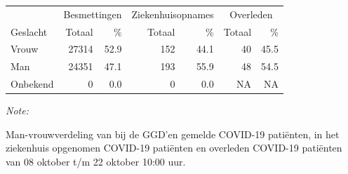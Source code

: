 \documentclass[
  english,
  man,floatsintext]{apa6}
\begin{document}
\begin{table}
\centering\begingroup\fontsize{11}{13}\selectfont

\begin{threeparttable}
\begin{tabular}{lrrrrrr}
\toprule
\multicolumn{1}{c}{ } & \multicolumn{2}{c}{Besmettingen} & \multicolumn{2}{c}{Ziekenhuisopnames} & \multicolumn{2}{c}{Overleden} \\
\cmidrule(l{3pt}r{3pt}){2-3} \cmidrule(l{3pt}r{3pt}){4-5} \cmidrule(l{3pt}r{3pt}){6-7}
Geslacht & Totaal & \% & Totaal & \% & Totaal & \%\\
\midrule
Vrouw & 27314 & 52.9 & 152 & 44.1 & 40 & 45.5\\
Man & 24351 & 47.1 & 193 & 55.9 & 48 & 54.5\\
Onbekend & 0 & 0.0 & 0 & 0.0 & NA & NA\\
\bottomrule
\end{tabular}
\begin{tablenotes}
\item \textit{Note: } 
\item Man-vrouwverdeling van bij de GGD’en gemelde COVID-19 patiënten, in het ziekenhuis opgenomen COVID-19 patiënten en overleden COVID-19 patiënten van 08 oktober t/m 22 oktober 10:00 uur.
\end{tablenotes}
\end{threeparttable}
\endgroup{}
\end{table}
\newpage
\end{document}
